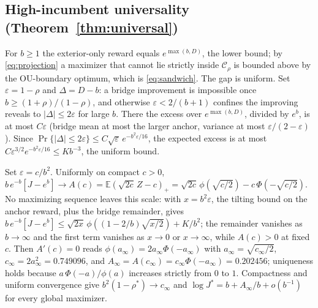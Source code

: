 \documentclass[11pt]{article}
\theoremstyle{itheads}
\newcommand{\E}{\mathbb{E}}
\begin{document}
\subsection*{High-incumbent universality (Theorem~\ref{thm:universal})}

For $b\ge1$ the exterior-only reward equals $e^{\max(b,D)}$, the lower
bound; by \eqref{eq:projection} a maximizer that cannot lie strictly
inside $\mathcal{C}_\rho$ is bounded above by the OU-boundary optimum,
which is \eqref{eq:sandwich}. The gap is uniform. Set
$\varepsilon=1-\rho$ and $\Delta=D-b$: a bridge improvement is
impossible once $b\ge(1+\rho)/(1-\rho)$, and otherwise
$\varepsilon<2/(b+1)$ confines the improving reveals to
$|\Delta|\le2\varepsilon$ for large $b$. There the excess over
$e^{\max(b,D)}$, divided by $e^{b}$, is at most $C\varepsilon$ (bridge
mean at most the larger anchor, variance at most
$\varepsilon/(2-\varepsilon)$). Since
$\Pr\{|\Delta|\le2\varepsilon\}\le C\sqrt{\varepsilon}\,
e^{-b^{2}\varepsilon/16}$, the expected excess is at most
$C\varepsilon^{3/2}e^{-b^{2}\varepsilon/16}\le Kb^{-3}$, the uniform
bound.

Set $\varepsilon=c/b^{2}$. Uniformly on compact $c>0$,
$b\,e^{-b}[J-e^{b}]\to A(c)=\E(\sqrt{2c}\,Z-c)_+
=\sqrt{2c}\,\phi(\sqrt{c/2})-c\,\Phi(-\sqrt{c/2})$. No maximizing
sequence leaves this scale: with $x=b^{2}\varepsilon$, the tilting bound
on the anchor reward, plus the bridge remainder, gives
$b\,e^{-b}[J-e^{b}]\le\sqrt{2x}\,\phi((1-2/b)\sqrt{x/2})+K/b^{2}$; the
remainder vanishes as $b\to\infty$ and the first term vanishes as
$x\to0$ or $x\to\infty$, while $A(c)>0$ at fixed $c$. Then
$A'(c)=0$ reads $\phi(a_\infty)=2a_\infty\Phi(-a_\infty)$ with
$a_\infty=\sqrt{c_\infty/2}$, $c_\infty=2a_\infty^{2}=0.749096$, and
$A_\infty=A(c_\infty)=c_\infty\Phi(-a_\infty)=0.202456$; uniqueness
holds because $a\,\Phi(-a)/\phi(a)$ increases strictly from $0$ to $1$.
Compactness and uniform convergence give $b^{2}(1-\rho^{*})\to c_\infty$
and $\log J^{*}=b+A_\infty/b+o(b^{-1})$ for every global maximizer.
\end{document}
